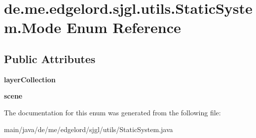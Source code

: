 \hypertarget{enumde_1_1me_1_1edgelord_1_1sjgl_1_1utils_1_1_static_system_1_1_mode}{}\section{de.\+me.\+edgelord.\+sjgl.\+utils.\+Static\+System.\+Mode Enum Reference}
\label{enumde_1_1me_1_1edgelord_1_1sjgl_1_1utils_1_1_static_system_1_1_mode}
\subsection*{Public Attributes}
\begin{DoxyCompactItemize}
\item 
\mbox{\label{enumde_1_1me_1_1edgelord_1_1sjgl_1_1utils_1_1_static_system_1_1_mode_a828cdedce3802ee6da60db046eb6a506}} 
{\bfseries layer\+Collection}
\item 
\mbox{\label{enumde_1_1me_1_1edgelord_1_1sjgl_1_1utils_1_1_static_system_1_1_mode_a721303adf68f9d9d86fec41ea185b998}} 
{\bfseries scene}
\end{DoxyCompactItemize}


The documentation for this enum was generated from the following file\+:\begin{DoxyCompactItemize}
\item 
main/java/de/me/edgelord/sjgl/utils/Static\+System.\+java\end{DoxyCompactItemize}
